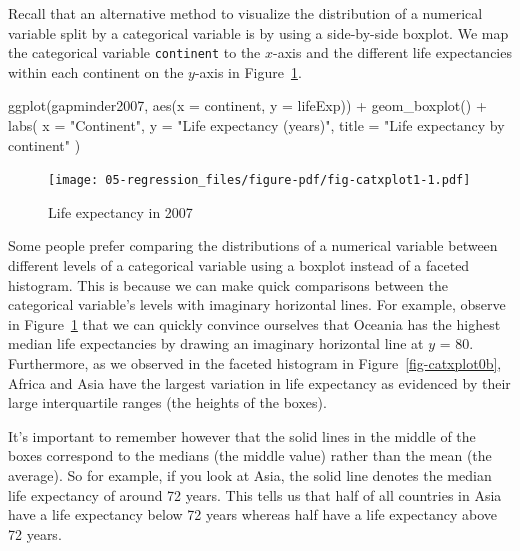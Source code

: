 \documentclass[
  letterpaper,
  DIV=11,
  numbers=noendperiod]{scrreprt}
\newenvironment{Shaded}{\begin{snugshade}}{\end{snugshade}}
\newcommand{\AttributeTok}[1]{\textcolor[rgb]{0.40,0.45,0.13}{#1}}
\newcommand{\FunctionTok}[1]{\textcolor[rgb]{0.28,0.35,0.67}{#1}}
\newcommand{\NormalTok}[1]{\textcolor[rgb]{0.00,0.23,0.31}{#1}}
\newcommand{\SpecialCharTok}[1]{\textcolor[rgb]{0.37,0.37,0.37}{#1}}
\newcommand{\StringTok}[1]{\textcolor[rgb]{0.13,0.47,0.30}{#1}}
\theoremstyle{definition}
\theoremstyle{remark}
\begin{document}
Recall that an alternative method to visualize the distribution of a
numerical variable split by a categorical variable is by using a
side-by-side boxplot. We map the categorical variable \texttt{continent}
to the \(x\)-axis and the different life expectancies within each
continent on the \(y\)-axis in Figure~\ref{fig-catxplot1}.

\begin{Shaded}
\begin{Highlighting}[]
\FunctionTok{ggplot}\NormalTok{(gapminder2007, }\FunctionTok{aes}\NormalTok{(}\AttributeTok{x =}\NormalTok{ continent, }\AttributeTok{y =}\NormalTok{ lifeExp)) }\SpecialCharTok{+}
  \FunctionTok{geom\_boxplot}\NormalTok{() }\SpecialCharTok{+}
  \FunctionTok{labs}\NormalTok{(}
    \AttributeTok{x =} \StringTok{"Continent"}\NormalTok{, }
    \AttributeTok{y =} \StringTok{"Life expectancy (years)"}\NormalTok{,}
    \AttributeTok{title =} \StringTok{"Life expectancy by continent"}
\NormalTok{    )}
\end{Highlighting}
\end{Shaded}

\begin{figure}[H]

{\centering \texttt{[image: 05-regression\_files/figure-pdf/fig-catxplot1-1.pdf]}

}

\caption{\label{fig-catxplot1}Life expectancy in 2007}

\end{figure}

Some people prefer comparing the distributions of a numerical variable
between different levels of a categorical variable using a boxplot
instead of a faceted histogram. This is because we can make quick
comparisons between the categorical variable's levels with imaginary
horizontal lines. For example, observe in Figure~\ref{fig-catxplot1}
that we can quickly convince ourselves that Oceania has the highest
median life expectancies by drawing an imaginary horizontal line at
\(y\) = 80. Furthermore, as we observed in the faceted histogram in
Figure~\ref{fig-catxplot0b}, Africa and Asia have the largest variation
in life expectancy as evidenced by their large interquartile ranges (the
heights of the boxes).

It's important to remember however that the solid lines in the middle of
the boxes correspond to the medians (the middle value) rather than the
mean (the average). So for example, if you look at Asia, the solid line
denotes the median life expectancy of around 72 years. This tells us
that half of all countries in Asia have a life expectancy below 72 years
whereas half have a life expectancy above 72 years.
\end{document}

